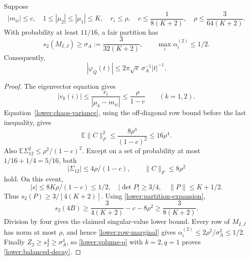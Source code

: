 \begin{lemma}\label{lower:balanced}
Suppose
\[
 |m_{ii}|\leq c,\quad
 1\leq|\mu_2|\leq|\mu_1|\leq K,\quad
 r_i\leq\rho,\quad
 c\leq\frac1{8(K+2)},\quad
 \rho\leq\frac3{64(K+2)}.
\]
With probability at least $11/16$, a fair partition has
\[
 s_2(M_{I,J})\geq\sigma_A:=\frac3{32(K+2)},
 \qquad \max_i\alpha_i^{(2)}\leq1/2.
\]
Consequently,
\begin{equation}\label{lower:balanced-decay}
 |\varphi_Q(t)|\leq2\pi\sqrt e\,\sigma_A^{-1}|t|^{-1}.
\end{equation}
\end{lemma}
\begin{proof}
The eigenvector equation gives
\[
 |v_k(i)|\leq\frac{r_i}{|\mu_k-m_{ii}|}
            \leq\frac\rho{1-c}\qquad(k=1,2).
\]
Equation~\eqref{lower:chaos-variance}, using the off-diagonal row
bound before the last inequality, gives
\[
 \mathbb E\|C\|_F^2\leq\frac{8\rho^4}{(1-c)^2}\leq16\rho^4.
\]
Also $\mathbb E\Sigma_{12}^2\leq\rho^2/(1-c)^2$.
Except on a set of probability at most $1/16+1/4=5/16$, both
\[
 |\Sigma_{12}|\leq4\rho/(1-c),\qquad \|C\|_F\leq8\rho^2
\]
hold.  On this event,
\[
 |s|\leq8K\rho/(1-c)\leq1/2,
 \quad |\det P|\geq3/4,\quad \|P\|\leq K+1/2.
\]
Thus $s_2(P)\geq3/[4(K+2)]$.  Using
\eqref{lower:partition-expansion},
\[
 s_2(4B)\geq\frac3{4(K+2)}-c-8\rho^2
             \geq\frac3{8(K+2)}.
\]
Division by four gives the claimed singular-value lower bound.
Every row of $M_{I,J}$ has norm at most $\rho$, and hence
\eqref{lower:row-marginal} gives
$\alpha_i^{(2)}\leq2\rho^2/\sigma_A^2\leq1/2$.
Finally $Z_2\geq s_2^4\geq\sigma_A^4$, so
\eqref{lower:volume-q} with $k=2,q=1$ proves
\eqref{lower:balanced-decay}.
\end{proof}

